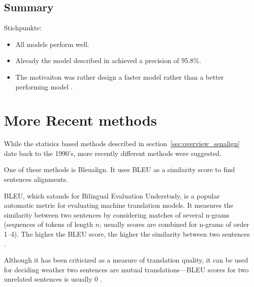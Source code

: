 \subsection{Summary}
Stichpunkte:
\begin{itemize}
	\item All models perform well.
	\item Already the model described in \cite{gale-church-1991-program} achieved a precision of 95.8\%.
	\item The motivaiton was rather design a faster model rather than a better performing model \autocite{chen-1993-aligning}.
\end{itemize}


\section{More Recent methods}
While the statisics based methods described in section~\ref{sec:overview_senalign} date back to the 1990's, more recently different methods were suggested.

One of these methods is Bleualign. 
It uses BLEU as a similarity score to find sentences alignments.

BLEU, which satands for Bilingual Evaluation Understudy, is a popular automatic metric for evaluating machine translation models. It measures the similarity between two sentences by considering matches of several n-grams (sequences of tokens of length \(n\); usually scores are combined for n-grams of order 1--4). 
The higher the BLEU score, the higher the similarity between two sentences \autocite[226]{koehn2009}.

Although it has been criticized as a measure of translation quality, it can be used for deciding weather two sentences are mutual translations---BLEU scores for two unrelated sentences is usually 0 \autocite{sennrich-volk-2010-mt}. 

